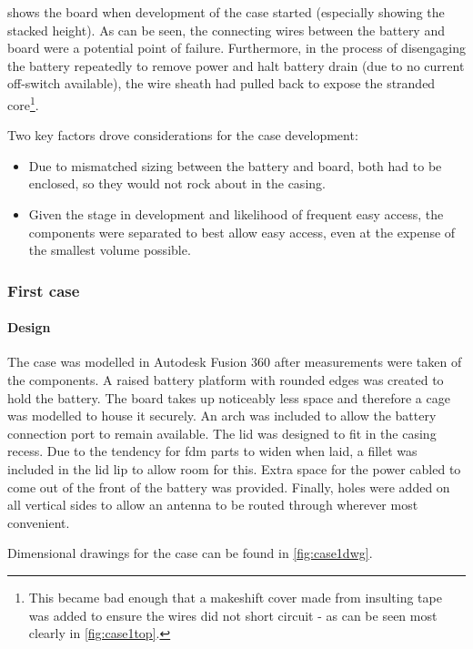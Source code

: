  shows the board when development of the case started (especially
showing the stacked height).
As can be seen, the connecting wires between the battery and board were a potential
point of failure. Furthermore, in the process of disengaging the battery repeatedly
to remove power and halt battery drain (due to no current off-switch available),
the wire sheath had pulled back to expose the stranded core\footnote{This became
    bad enough that a makeshift cover made from insulting tape was added to ensure the wires
    did not short circuit - as can be seen most clearly in \cref{fig:case1top}.
}.

Two key factors drove considerations for the case development:
\begin{itemize}
    \item Due to mismatched sizing between the battery and board, both had to be enclosed, so they
          would not rock about in the casing.
    \item Given the stage in development and likelihood of frequent easy access, the components
          were separated to best allow easy access, even at the expense of the smallest volume possible.
\end{itemize}

\subsubsection{First case}
\paragraph{Design}
The case was modelled in Autodesk Fusion 360 after measurements were taken
of the components. A raised battery platform with rounded
edges was created to hold the battery. The board takes up noticeably less space and
therefore a cage was modelled to house it securely. An arch was included to allow the
battery connection port to remain available. The lid was designed to fit in the casing
recess. Due to the tendency for \gls{fdm} parts to widen when laid, a fillet was
included in the lid lip to allow room for this. Extra space for the power cabled to
come out of the front of the battery was provided.
Finally, holes were added on all vertical
sides to allow an antenna to be routed through wherever most convenient.

Dimensional drawings for the case can be found in \cref{fig:case1dwg}.

